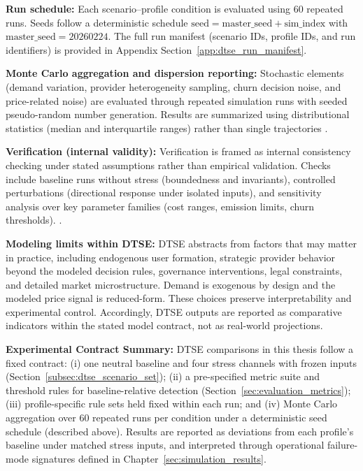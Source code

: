 \noindent\textbf{Run schedule:} Each scenario--profile condition is evaluated using 60 repeated runs. Seeds follow a deterministic schedule \(\text{seed}=\text{master\_seed}+\text{sim\_index}\) with \(\text{master\_seed}=20260224\). The full run manifest (scenario IDs, profile IDs, and run identifiers) is provided in Appendix Section~\ref{app:dtse_run_manifest}.

\noindent\textbf{Monte Carlo aggregation and dispersion reporting:}
Stochastic elements (demand variation, provider heterogeneity sampling, churn decision noise, and price-related noise) are evaluated through repeated simulation runs with seeded pseudo-random number generation. Results are summarized using distributional statistics (median and interquartile ranges) rather than single trajectories \cite{Morris2019}.

\noindent\textbf{Verification (internal validity):}
Verification is framed as internal consistency checking under stated assumptions rather than empirical validation. Checks include baseline runs without stress (boundedness and invariants), controlled perturbations (directional response under isolated inputs), and sensitivity analysis over key parameter families (cost ranges, emission limits, churn thresholds).
\cite{Collins2024, Braakman2022}.

\noindent\textbf{Modeling limits within DTSE:}
DTSE abstracts from factors that may matter in practice, including endogenous user formation, strategic provider behavior beyond the modeled decision rules, governance interventions, legal constraints, and detailed market microstructure. Demand is exogenous by design and the modeled price signal is reduced-form. These choices preserve interpretability and experimental control. Accordingly, DTSE outputs are reported as comparative indicators within the stated model contract, not as real-world projections.

\noindent\textbf{Experimental Contract Summary:}
DTSE comparisons in this thesis follow a fixed contract: (i) one neutral baseline and four stress channels with frozen inputs (Section~\ref{subsec:dtse_scenario_set}); (ii) a pre-specified metric suite and threshold rules for baseline-relative detection (Section~\ref{sec:evaluation_metrics}); (iii) profile-specific rule sets held fixed within each run; and (iv) Monte Carlo aggregation over 60 repeated runs per condition under a deterministic seed schedule (described above). Results are reported as deviations from each profile's baseline under matched stress inputs, and interpreted through operational failure-mode signatures defined in Chapter~\ref{sec:simulation_results}.
